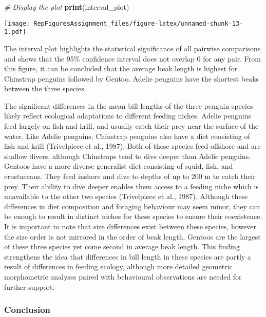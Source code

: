 \documentclass[
]{article}
\newenvironment{Shaded}{\begin{snugshade}}{\end{snugshade}}
\newcommand{\CommentTok}[1]{\textcolor[rgb]{0.56,0.35,0.01}{\textit{#1}}}
\newcommand{\FunctionTok}[1]{\textcolor[rgb]{0.13,0.29,0.53}{\textbf{#1}}}
\newcommand{\NormalTok}[1]{#1}
\begin{document}
\begin{Shaded}
\begin{Highlighting}[]
\CommentTok{\# Display the plot}
\FunctionTok{print}\NormalTok{(interval\_plot)}
\end{Highlighting}
\end{Shaded}

\texttt{[image: RepFiguresAssignment\_files/figure-latex/unnamed-chunk-13-1.pdf]}

The interval plot highlights the statistical significance of all
pairwise comparisons and shows that the 95\% confidence interval does
not overlap 0 for any pair. From this figure, it can be concluded that
the average beak length is highest for Chinstrap penguins followed by
Gentoo. Adelie penguins have the shortest beaks between the three
species.

The significant differences in the mean bill lengths of the three
penguin species likely reflect ecological adaptations to different
feeding niches. Adelie penguins feed largely on fish and krill, and
usually catch their prey near the surface of the water. Like Adelie
penguins, Chinstrap penguins also have a diet consisting of fish and
krill (Trivelpiece et al., 1987). Both of these species feed offshore
and are shallow divers, although Chinstraps tend to dive deeper than
Adelie penguins. Gentoos have a more diverse generalist diet consisting
of squid, fish, and crustaceans. They feed inshore and dive to depths of
up to 200 m to catch their prey. Their ability to dive deeper enables
them access to a feeding niche which is unavailable to the other two
species (Trivelpiece et al., 1987). Although these differences in diet
composition and foraging behaviour may seem minor, they can be enough to
result in distinct niches for these species to ensure their coexistence.
It is important to note that size differences exist between these
species, however the size order is not mirrored in the order of beak
length. Gentoos are the largest of these three species yet come second
in average beak length. This finding strengthens the idea that
differences in bill length in these species are partly a result of
differences in feeding ecology, although more detailed geometric
morphometric analyses paired with behavioural observations are needed
for further support.

\subsubsection{Conclusion}\label{conclusion}
\end{document}
